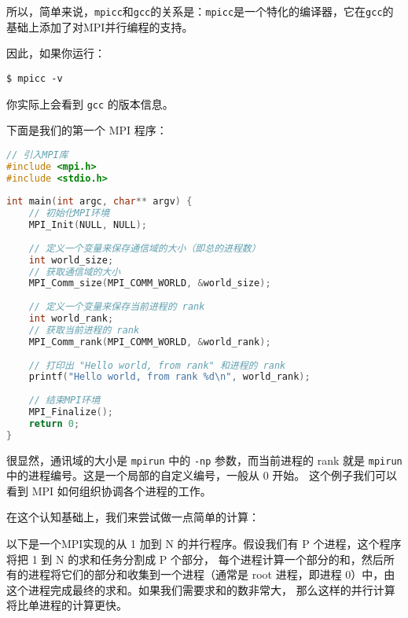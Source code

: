\documentclass{ctexart}
\begin{document}
所以，简单来说，\verb|mpicc|和\verb|gcc|的关系是：\verb|mpicc|是一个特化的编译器，它在\verb|gcc|的基础上添加了对MPI并行编程的支持。  

因此，如果你运行：
\begin{verbatim}
$ mpicc -v
\end{verbatim}
你实际上会看到 \verb|gcc| 的版本信息。


下面是我们的第一个 MPI 程序：

\begin{lstlisting}[language=C]
// 引入MPI库  
#include <mpi.h>  
#include <stdio.h>  
      
int main(int argc, char** argv) {  
    // 初始化MPI环境  
    MPI_Init(NULL, NULL);  
      
    // 定义一个变量来保存通信域的大小（即总的进程数）  
    int world_size;  
    // 获取通信域的大小  
    MPI_Comm_size(MPI_COMM_WORLD, &world_size);  
      
    // 定义一个变量来保存当前进程的 rank  
    int world_rank;  
    // 获取当前进程的 rank  
    MPI_Comm_rank(MPI_COMM_WORLD, &world_rank);  
      
    // 打印出 "Hello world, from rank" 和进程的 rank
    printf("Hello world, from rank %d\n", world_rank);  
      
    // 结束MPI环境  
    MPI_Finalize();  
    return 0;  
}  
\end{lstlisting}    

很显然，通讯域的大小是 \verb|mpirun| 中的 \verb|-np| 参数，而当前进程的 rank 就是 \verb|mpirun| 中的进程编号。这是一个局部的自定义编号，一般从 0 开始。
这个例子我们可以看到 MPI 如何组织协调各个进程的工作。

在这个认知基础上，我们来尝试做一点简单的计算：

以下是一个MPI实现的从 1 加到 N 的并行程序。假设我们有 P 个进程，这个程序将把 1 到 N 的求和任务分割成 P 个部分，
每个进程计算一个部分的和，然后所有的进程将它们的部分和收集到一个进程（通常是 root 进程，即进程 0）中，由这个进程完成最终的求和。如果我们需要求和的数非常大，
那么这样的并行计算将比单进程的计算更快。
\end{document}
